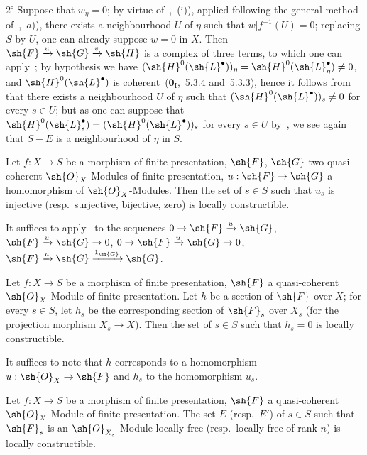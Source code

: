 $2^\circ$ Suppose that $w_\eta=0$; by virtue of~,~(i)), applied following the general method of~,~$a$)), there exists a neighbourhood $U$ of $\eta$ such that $w|f^{-1}(U)=0$; replacing $S$ by $U$, one can already suppose $w=0$ in $X$.
Then $\sh{F}\xrightarrow{u}\sh{G}\xrightarrow{v}\sh{H}$ is a complex of three terms, to which one can apply~; by hypothesis we have $(\sh{H}^0(\sh{L}^\bullet))_\eta=\sh{H}^0(\sh{L}^\bullet_\eta)\neq 0$, and $\sh{H}^0(\sh{L}^\bullet)$ is coherent~($\mathbf{0}_{\mathrm{I}}$,~5.3.4 and~5.3.3), hence it follows from~ that there exists a neighbourhood $U$ of $\eta$ such that $(\sh{H}^0(\sh{L}^\bullet))_s\neq 0$ for every $s\in U$; but as one can suppose that $\sh{H}^0(\sh{L}^\bullet_s)=(\sh{H}^0(\sh{L}^\bullet))_s$ for every $s\in U$ by~, we see again that $S-E$ is a neighbourhood of $\eta$ in $S$.

\begin{corollary}[9.4.5]
\label{IV.9.4.5}
Let $f:X\to S$ be a morphism of finite presentation, $\sh{F}$, $\sh{G}$ two quasi-coherent $\sh{O}_X$-Modules of finite presentation, $u:\sh{F}\to\sh{G}$ a homomorphism of $\sh{O}_X$-Modules.
Then the set of $s\in S$ such that $u_s$ is injective \textnormal{(}resp.\ surjective, bijective, zero\textnormal{)} is locally constructible.
\end{corollary}

It suffices to apply~ to the sequences $0\to\sh{F}\xrightarrow{u}\sh{G}$, $\sh{F}\xrightarrow{u}\sh{G}\to 0$, $0\to\sh{F}\xrightarrow{u}\sh{G}\to 0$, $\sh{F}\xrightarrow{u}\sh{G}\xrightarrow{1_\sh{G}}\sh{G}$.


\begin{corollary}[9.4.6]
\label{IV.9.4.6}
Let $f:X\to S$ be a morphism of finite presentation, $\sh{F}$ a quasi-coherent $\sh{O}_X$-Module of finite presentation.
Let $h$ be a section of $\sh{F}$ over $X$; for every $s\in S$, let $h_s$ be the corresponding section of $\sh{F}_s$ over $X_s$ \textnormal{(}for the projection morphism $X_s\to X$\textnormal{)}.
Then the set of $s\in S$ such that $h_s=0$ is locally constructible.
\end{corollary}

It suffices to note that $h$ corresponds to a homomorphism $u:\sh{O}_X\to\sh{F}$ and $h_s$ to the homomorphism $u_s$.

\begin{proposition}[9.4.7]
\label{IV.9.4.7}
Let $f:X\to S$ be a morphism of finite presentation, $\sh{F}$ a quasi-coherent $\sh{O}_X$-Module of finite presentation.
The set $E$ \textnormal{(}resp.\ $E'$\textnormal{)} of $s\in S$ such that $\sh{F}_s$ is an $\sh{O}_{X_s}$-Module locally free \textnormal{(}resp.\ locally free of rank $n$\textnormal{)} is locally constructible.
\end{proposition}

